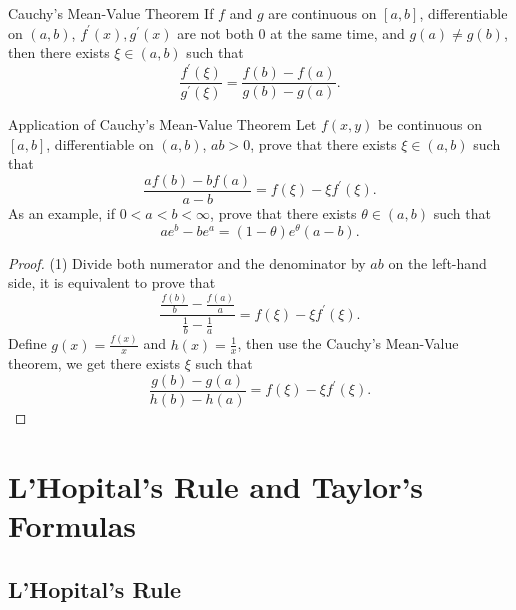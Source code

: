 \begin{theorem}{Cauchy's Mean-Value Theorem}{}
  If $f$ and $g$ are continuous on $[a, b]$,
  differentiable on $(a, b)$,
  $f^{\prime}(x), g^{\prime}(x)$ are not both $0$ at the same time,
  and $g(a) \neq g(b)$, then there exists $\xi \in (a, b)$ such that
  \begin{equation}
    \frac{f^{\prime}(\xi)}{g^{\prime}(\xi)} = \frac{f(b) - f(a)}{g(b) - g(a)}.
  \end{equation}
\end{theorem}

\begin{example}{Application of Cauchy's Mean-Value Theorem}{}
  Let $f(x, y)$ be continuous on $[a, b]$, differentiable on $(a, b)$, $ab > 0$,
  prove that there exists $\xi \in (a, b)$ such that
  \begin{equation}
    \frac{af(b) - bf(a)}{a - b} = f(\xi) - \xi f^{\prime}(\xi).
  \end{equation}
  As an example, if $0 < a < b < \infty$, prove that there exists $\theta \in
  (a, b)$ such that
  \begin{equation}
    ae^b - be^a = (1 - \theta) e^{\theta}(a-b).
  \end{equation}
\end{example}

\begin{proof}
  (1) Divide both numerator and the denominator by $ab$ on the left-hand side,
  it is equivalent to prove that
  \begin{equation}
    \frac{\frac{f(b)}{b} - \frac{f(a)}{a}}{\frac{1}{b} - \frac{1}{a}}
    = f(\xi) - \xi f^{\prime}(\xi).
  \end{equation}
  Define $g(x) = \frac{f(x)}{x}$ and $h(x) = \frac{1}{x}$, then use the Cauchy's
  Mean-Value theorem, we get there exists $\xi$ such that
  \begin{equation}
    \frac{g(b) - g(a)}{h(b) - h(a)} = f(\xi) - \xi f^{\prime}(\xi).
  \end{equation}
\end{proof}

\section{L'Hopital's Rule and Taylor's Formulas}

\subsection{L'Hopital's Rule}

